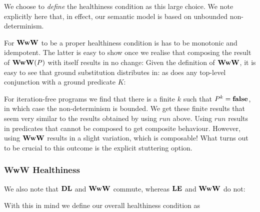 We choose to \emph{define} the healthiness condition as
this large choice.
 We note explicitly here that, in effect, our semantic model is based on
unbounded non-determinism.

For $\mathbf{WwW}$ to be a proper healthiness condition
is has to be monotonic and idempotent.
The latter is easy to show once we realise that composing the result
of $\mathbf{WwW}(P)$ with itself results in no change:
Given the definition of $\mathbf{WwW}$, it is easy to see that ground
substitution distributes in:
as does any top-level conjunction with a ground predicate $K$:



For iteration-free programs
we find that there is a finite $k$ such that $P^k = \mathbf{false}$,
in which case the non-determinism is bounded.
We get these finite results that seem very similar
to the results obtained by using $run$ above.
Using $run$ results in predicates that cannot be composed
to get composite behaviour.
However, using $\mathbf{WwW}$ results in a slight variation,
which is composable!
What turns out to be crucial
to this outcome is the explicit stuttering option.

\subsubsection{WwW Healthiness}

We also note that $\mathbf{DL}$ and $\mathbf{WwW}$ commute,
whereas $\mathbf{LE}$ and $\mathbf{WwW}$ do not:

With this in mind we define our overall healthiness condition as

